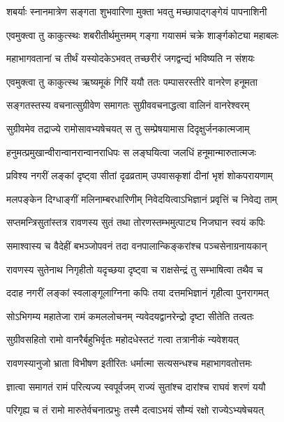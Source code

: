 
\twolineshloka
{शबर्याः स्नानमात्रेण सङ्गता शुभवारिणा}
{मुक्ता भवतु मच्छापाद्गङ्गेयं पापनाशिनी}%

\twolineshloka
{एवमुक्त्वा तु काकुत्स्थः शबरीतीर्थमुत्तमम्}
{गङ्गा गयासमं चक्रे शार्ङ्गकोट्या महाबलः}%

\twolineshloka
{महाभागवतानां च तीर्थं यस्योदकेऽभवत्}
{तच्छरीरं जगद्वन्द्यं भविष्यति न संशयः}%

\twolineshloka
{एवमुक्त्वा तु काकुत्स्थ ऋष्यमूकं गिरिं ययौ}
{ततः पम्पासरस्तीरे वानरेण हनूमता}%

\twolineshloka
{सङ्गतस्तस्य वचनात्सुग्रीवेण समागतः}
{सुग्रीववचनाद्धत्वा वालिनं वानरेश्वरम्}%

\twolineshloka
{सुग्रीवमेव तद्राज्ये रामोसावभ्यषेचयत्}
{स तु सम्प्रेषयामास दिदृक्षुर्जनकात्मजाम्}%

\twolineshloka
{हनुमत्प्रमुखान्वीरान्वानरान्वानराधिपः}
{स लङ्घयित्वा जलधिं हनूमान्मारुतात्मजः}%

\twolineshloka
{प्रविश्य नगरीं लङ्कां दृष्ट्वा सीतां दृढव्रताम्}
{उपवासकृशां दीनां भृशं शोकपरायणाम्}%

\twolineshloka
{मलपङ्केन दिग्धाङ्गीं मलिनाम्बरधारिणीम्}
{निवेदयित्वाऽभिज्ञानं प्रवृत्तिं च निवेद्य ताम्}%

\twolineshloka
{सप्तमन्त्रिसुतांस्तत्र रावणस्य सुतं तथा}
{तोरणस्तम्भमुत्पाट्य निजघान स्वयं कपिः}%

\twolineshloka
{समाश्वास्य च वैदेहीं बभञ्जोपवनं तदा}
{वनपालान्किङ्करांश्च पञ्चसेनाग्रनायकान्}%

\twolineshloka
{रावणस्य सुतेनाथ निगृहीतो यदृच्छया}
{दृष्ट्वा च राक्षसेन्द्रं तु सम्भाषित्वा तथैव च}%

\twolineshloka
{ददाह नगरीं लङ्कां स्वलाङ्गूलाग्निना कपिः}
{तया दत्तमभिज्ञानं गृहीत्वा पुनरागमत्}%

\twolineshloka
{सोऽभिगम्य महातेजा रामं कमललोचनम्}
{न्यवेदयद्वानरेन्द्रो दृष्टा सीतेति तत्वतः}%

\twolineshloka
{सुग्रीवसहितो रामो वानरैर्बहुभिर्वृतः}
{महोदधेस्तटं गत्वा तत्रानीकं न्यवेशयत्}%

\twolineshloka
{रावणस्यानुजो भ्राता विभीषण इतीरितः}
{धर्मात्मा सत्यसन्धश्च महाभागवतोत्तमः}%

\twolineshloka
{ज्ञात्वा समागतं रामं परित्यज्य स्वपूर्वजम्}
{राज्यं सुतांश्च दारांश्च राघवं शरणं ययौ}%

\twolineshloka
{परिगृह्य च तं रामो मारुतेर्वचनात्प्रभुः}
{तस्मै दत्वाऽभयं सौम्यं रक्षो राज्येऽभ्यषेचयत्}%

